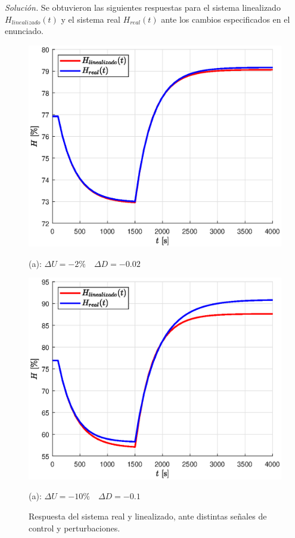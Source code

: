 \textit{Solución.} Se obtuvieron las siguientes respuestas para el sistema linealizado $H _{linealizado}(t)$ y el sistema real $H _{real}(t)$ ante los cambios especificados en el enunciado.

\begin{figure}[!h]
    \centering
    \begin{minipage}{0.5\linewidth}
        \centering
        \includegraphics[width = 0.8\linewidth]{figs/fig4.eps}
        \caption*{(a): $\Delta U = -2\% \quad \Delta D = -0.02$}
    \end{minipage}%
    \begin{minipage}{0.5\linewidth}
        \centering
        \includegraphics[width = 0.8\linewidth]{figs/fig5.eps}
        \caption*{(a): $\Delta U = -10\% \quad \Delta D = -0.1$}
    \end{minipage}
    \caption{Respuesta del sistema real y linealizado, ante distintas señales de control y perturbaciones.}
    \label{etiqueta}
\end{figure}
\newpage

